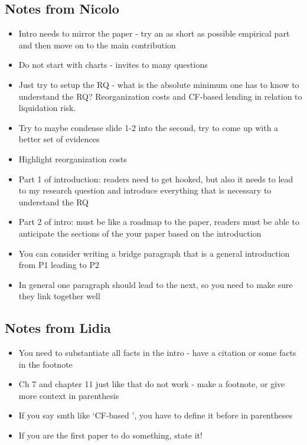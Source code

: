 \documentclass[12pt]{article}
\begin{document}
\subsection*{Notes from Nicolo} 
\begin{itemize} \setlength\itemsep{0em}  \small
    \item Intro needs to mirror the paper - try an as short as possible empirical part and then move on to the main contribution
    \item Do not start with charts - invites to many questions 
    \item Just try to setup the RQ - what is the absolute minimum one has to know to understand the RQ? Reorganization costs and CF-based lending in relation to liquidation risk. 
    \item Try to maybe condense slide 1-2 into the second, try to come up with a better set of evidences
    \item Highlight reorganization costs
    \item Part 1 of introduction: readers need to get hooked, but also it needs to lead to my research question and introduce everything that is necessary to understand the RQ
    \item Part 2 of intro: must be like a roadmap to the paper, readers must be able to anticipate the sections of the your paper based on the introduction
    \item You can consider writing a bridge paragraph that is a general introduction from P1 leading to P2
    \item In general one paragraph should lead to the next, so you need to make sure they link together well
\end{itemize} \normalsize

\subsection*{Notes from Lidia} 
\begin{itemize} \setlength\itemsep{0em}  \small
    \item You need to substantiate all facts in the intro - have a citation or some facts in the footnote
    \item Ch 7 and chapter 11 just like that do not work - make a footnote, or give more context in parenthesis
    \item If you say smth like `CF-based ', you have to define it before in parentheses
    \item If you are the first paper to do something, state it! 
\end{itemize} \normalsize
\end{document}
